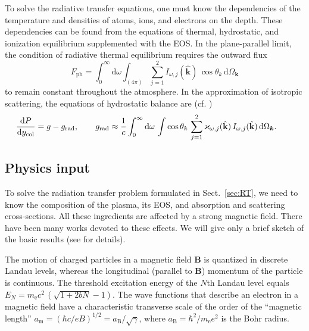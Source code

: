 \documentclass{pos1}
\newcommand{\beq}{\begin{equation}}
\newcommand{\eeq}{\end{equation}}
\newcommand{\aB}{a_\mathrm{B}}
\newcommand{\am}{a_\mathrm{m}}
\newcommand{\dd}{\mathrm{d}}
\newcommand{\khat}{\hat{\mathbf{k}}}
\newcommand{\mel}{m_\mathrm{e}}
\newcommand{\Omk}[1]{\Omega_{#1}}
\newcommand{\opac}{\varkappa}
\newcommand{\ycol}{y_\mathrm{col}}
\begin{document}
To solve the radiative transfer equations, one must know the
dependencies of the temperature and densities of atoms, ions, and
electrons on the depth. These dependencies can be found from the
equations of thermal, hydrostatic, and ionization equilibrium
supplemented with the EOS. In the plane-parallel limit, the condition
of radiative thermal equilibrium requires the outward flux 
\beq
   F_\mathrm{ph} = \int_0^\infty\dd\omega 
      \int_{(4\pi)} \sum_{j=1}^2 I_{\omega,j}(\khat)
      \,\cos\theta_k\,\dd\Omk{\bm{k}}
\label{Fph}
\eeq
to remain constant throughout the atmosphere. In the approximation of
isotropic scattering, the equations of
hydrostatic balance are (cf.{} \cite{SuleimanovPouW12})
\beq
   \frac{\dd P}{\dd \ycol} = g - g_\mathrm{rad},
\qquad
   g_\mathrm{rad} 
\approx
    \frac{1}{c} 
   \int_0^\infty \dd\omega\,
    \int
    \cos\theta_k\, \sum_{j=1}^2
     \opac_{\omega,j}(\khat)\,I_{\omega,j}(\khat)
       \,\dd\Omk{\bm{k}}.
\hspace*{2em}\label{grad}
\eeq

\subsection{Physics input}
\label{sec:physinput}

To solve the radiation transfer problem formulated in
Sect.~\ref{sec:RT}, we need to know the composition of the plasma, its
EOS, and absorption and scattering cross-sections. All these
ingredients are affected by a strong magnetic field. There have been
many works devoted to these effects. We will give
only a brief sketch of the basic results (see \cite{P14} for details).

The motion of charged particles in a magnetic field $\bm{B}$ is
quantized in discrete Landau levels, whereas the longitudinal
(parallel to $\bm{B}$) momentum of the particle is continuous. The
threshold excitation energy of the $N$th Landau level equals $E_N=\mel
c^2 \,(\sqrt{1+2bN}-1)$. The wave functions that describe an electron
in a magnetic field \cite{SokTer} have a characteristic transverse
scale of the order of the ``magnetic length'' $\am=(\hbar
c/eB)^{1/2}=\aB/\sqrt{\gamma}$, where $\aB=\hbar^2/\mel e^2$ is the
Bohr radius.
\end{document}
